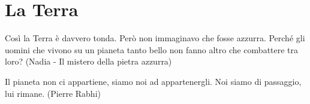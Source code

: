 \section{La Terra}

\begin{changemargin}{0.3cm}{0.3cm}\begin{enfasi}{
Così la Terra è davvero tonda. Però non immaginavo che fosse azzurra. Perché gli uomini che vivono su un pianeta tanto bello non fanno altro che combattere tra loro? (Nadia - Il mistero della pietra azzurra)

\medskip

Il pianeta non ci appartiene, siamo noi ad appartenergli. Noi siamo di passaggio, lui rimane. (Pierre Rabhi)}\end{enfasi}\end{changemargin}\medskip


